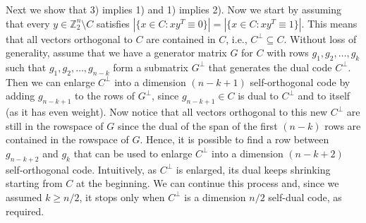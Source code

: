 \documentclass[twoside,romanappendices]{IEEEtran}
\begin{document}
\begin{IEEEproof}
Next we show that 3) implies 1) and 1) implies 2).
Now we start by assuming that every $y \in \mathbb{Z}_2^n \setminus C$ satisfies $|\{ x \in C \colon xy^T \equiv 0 \}| = |\{ x \in C \colon xy^T \equiv 1 \}|$.
This means that all vectors orthogonal to $C$ are contained in $C$, i.e., $C^{\perp} \subseteq C$.
Without loss of generality, assume that we have a generator matrix $G$ for $C$ with rows $g_1,g_2,\ldots,g_k$ such that $g_1,g_2,\ldots,g_{n-k}$ form a submatrix $G^{\perp}$ that generates the dual code $C^{\perp}$.
Then we can enlarge $C^{\perp}$ into a dimension $(n-k+1)$ self-orthogonal code by adding $g_{n-k+1}$ to the rows of $G^{\perp}$, since $g_{n-k+1} \in C$ is dual to $C^{\perp}$ and to itself (as it has even weight).
Now notice that all vectors orthogonal to this new $C^{\perp}$ are still in the rowspace of $G$ since the dual of the span of the first $(n-k)$ rows are contained in the rowspace of $G$.
Hence, it is possible to find a row between $g_{n-k+2}$ and $g_k$ that can be used to enlarge $C^{\perp}$ into a dimension $(n-k+2)$ self-orthogonal code.
Intuitively, as $C^{\perp}$ is enlarged, its dual keeps shrinking starting from $C$ at the beginning.
We can continue this process and, since we assumed $k \geq n/2$, it stops only when $C^{\perp}$ is a dimension $n/2$ self-dual code, as required.
\end{IEEEproof}


    
\end{document}
